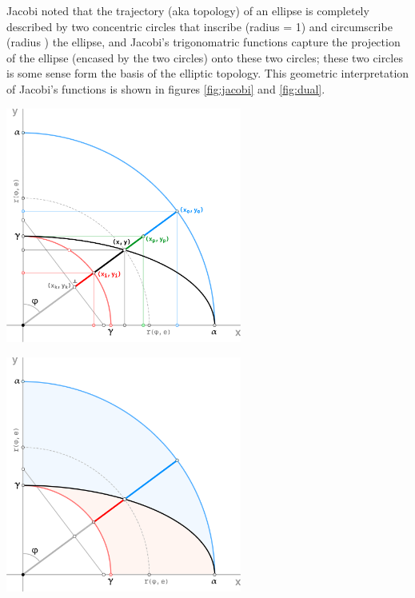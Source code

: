 \documentclass[a4paper,10pt]{article}
\begin{document}
\begin{flushleft}
{{  Jacobi noted that the trajectory (aka topology) of an ellipse is completely described by two concentric circles that inscribe (radius \raisebox{0.25mm}{\resizebox{6.5px}{5px}{\upgamma}} = 1) and circumscribe (radius {\resizebox{7.25px}{5.3px}{\upalpha}}) the ellipse, and Jacobi's trigonomatric functions capture the projection of the ellipse (encased by the two circles) onto these two circles; these two circles is some sense form the basis of the elliptic topology. This geometric interpretation of Jacobi's functions is shown in figures \ref{fig:jacobi} and \ref{fig:dual}.\linebreak
  }}
\end{flushleft}
\begin{multicols}{2}
  \noindent
  \begin{minipage}{\linewidth}
    \centering
    \includegraphics[width=77.5mm]{./img/jacobiSine.png}\vspace{1mm}
    \label{fig:jacobi}
  \end{minipage}
  \noindent
  \begin{minipage}{\linewidth}
    \centering
    \includegraphics[width=77.5mm]{./img/dualTopology.png}\vspace{1mm}
    \label{fig:dual}
  \end{minipage}
\end{multicols}
\end{document}
